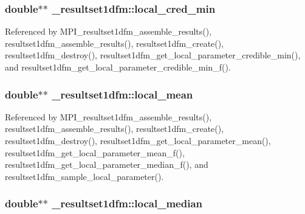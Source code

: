 \subsubsection[{\texorpdfstring{local\+\_\+cred\+\_\+min}{local_cred_min}}]{\setlength{\rightskip}{0pt plus 5cm}double$\ast$$\ast$ \+\_\+resultset1dfm\+::local\+\_\+cred\+\_\+min}\hypertarget{struct__resultset1dfm_acb42fb536fad644f52fa1fe83ca503d3}{}\label{struct__resultset1dfm_acb42fb536fad644f52fa1fe83ca503d3}


Referenced by M\+P\+I\+\_\+resultset1dfm\+\_\+assemble\+\_\+results(), resultset1dfm\+\_\+assemble\+\_\+results(), resultset1dfm\+\_\+create(), resultset1dfm\+\_\+destroy(), resultset1dfm\+\_\+get\+\_\+local\+\_\+parameter\+\_\+credible\+\_\+min(), and resultset1dfm\+\_\+get\+\_\+local\+\_\+parameter\+\_\+credible\+\_\+min\+\_\+f().

\subsubsection[{\texorpdfstring{local\+\_\+mean}{local_mean}}]{\setlength{\rightskip}{0pt plus 5cm}double$\ast$$\ast$ \+\_\+resultset1dfm\+::local\+\_\+mean}\hypertarget{struct__resultset1dfm_adb8f083b8d35b6edb2193e2dec73bac3}{}\label{struct__resultset1dfm_adb8f083b8d35b6edb2193e2dec73bac3}


Referenced by M\+P\+I\+\_\+resultset1dfm\+\_\+assemble\+\_\+results(), resultset1dfm\+\_\+assemble\+\_\+results(), resultset1dfm\+\_\+create(), resultset1dfm\+\_\+destroy(), resultset1dfm\+\_\+get\+\_\+local\+\_\+parameter\+\_\+mean(), resultset1dfm\+\_\+get\+\_\+local\+\_\+parameter\+\_\+mean\+\_\+f(), resultset1dfm\+\_\+get\+\_\+local\+\_\+parameter\+\_\+median\+\_\+f(), and resultset1dfm\+\_\+sample\+\_\+local\+\_\+parameter().

\subsubsection[{\texorpdfstring{local\+\_\+median}{local_median}}]{\setlength{\rightskip}{0pt plus 5cm}double$\ast$$\ast$ \+\_\+resultset1dfm\+::local\+\_\+median}\hypertarget{struct__resultset1dfm_aeb9c76e57ac7f44fb7a10777b418359f}{}\label{struct__resultset1dfm_aeb9c76e57ac7f44fb7a10777b418359f}


